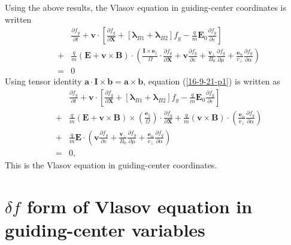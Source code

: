 \documentclass{llncs}
\newcommand{\tmmathbf}[1]{\ensuremath{\boldsymbol{#1}}}
\begin{document}
Using the above results, the Vlasov equation in guiding-center coordinates is
written
\begin{eqnarray}
  &  & \frac{\partial f_g}{\partial t} +\mathbf{v} \cdot \left[
  \frac{\partial f_g}{\partial \mathbf{X}} + [\tmmathbf{\lambda}_{B 1}
  +\tmmathbf{\lambda}_{B 2}] f_g - \frac{q}{m} \mathbf{E}_0 \frac{\partial
  f_g}{\partial \varepsilon} \right] \nonumber\\
  & + & \frac{q}{m} (\mathbf{E}+\mathbf{v} \times \mathbf{B}) \cdot \left(
  \frac{\mathbf{I} \times \tmmathbf{e}_{\parallel}}{\Omega} \cdot
  \frac{\partial f_g}{\partial \mathbf{X}} +\mathbf{v} \frac{\partial
  f_g}{\partial \varepsilon} + \frac{\mathbf{v}_{\perp}}{B_0}  \frac{\partial
  f_g}{\partial \mu} + \frac{\tmmathbf{e}_{\alpha}}{v_{\perp}}  \frac{\partial
  f_g}{\partial \alpha} \right) \nonumber\\
  & = & 0  \label{16-9-21-p1}
\end{eqnarray}
Using tensor identity $\mathbf{a} \cdot \mathbf{I} \times
\mathbf{b}=\mathbf{a} \times \mathbf{b}$, equation (\ref{16-9-21-p1}) is
written as
\begin{eqnarray}
  &  & \frac{\partial f_g}{\partial t} +\mathbf{v} \cdot \left[
  \frac{\partial f_g}{\partial \mathbf{X}} + [\tmmathbf{\lambda}_{B 1}
  +\tmmathbf{\lambda}_{B 2}] f_g - \frac{q}{m} \mathbf{E}_0 \frac{\partial
  f_g}{\partial \varepsilon} \right] \nonumber\\
  & + & \frac{q}{m} (\mathbf{E}+\mathbf{v} \times \mathbf{B}) \times \left(
  \frac{\tmmathbf{e}_{\parallel}}{\Omega}  \right) \cdot \frac{\partial
  f_g}{\partial \mathbf{X}} + \frac{q}{m} (\mathbf{v} \times \mathbf{B}) \cdot
  \left( \frac{\tmmathbf{e}_{\alpha}}{v_{\perp}}  \frac{\partial f_g}{\partial
  \alpha} \right) \nonumber\\
  & + & \frac{q}{m} \mathbf{E} \cdot \left( \mathbf{v} \frac{\partial
  f_g}{\partial \varepsilon} + \frac{\mathbf{v}_{\perp}}{B_0}  \frac{\partial
  f_g}{\partial \mu} + \frac{\tmmathbf{e}_{\alpha}}{v_{\perp}}  \frac{\partial
  f_g}{\partial \alpha} \right) \nonumber\\
  & = & 0,  \label{16-10-2-p1}
\end{eqnarray}
This is the Vlasov equation in guiding-center coordinates.

\section{$\delta f$ form of Vlasov equation in guiding-center variables}
\end{document}
